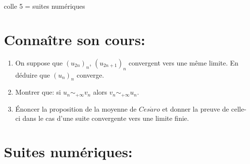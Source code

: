 \documentclass[a4paper,11pt]{article}
\theoremstyle{definition}
\begin{document}
	
	
	\begin{center}
		\Large \sc colle 5 = suites numériques
	\end{center}

\section*{Connaître son cours:}
\begin{enumerate}
	\item On suppose que $(u_{2n})_n$, $(u_{2n+1})_n$ convergent vers une même limite. En déduire que $(u_{n})_n$ converge.
	\item Montrer que: si $u_n \sim_{+\infty} v_n$ alors $v_n \sim_{+\infty} u_n$.
	\item Énoncer la proposition de la moyenne de $Ces\acute{a}ro$ et donner la preuve de celle-ci dans le cas d'une suite convergente vers une limite finie.  
\end{enumerate}


	\section*{Suites numériques:}
	
\end{document}
